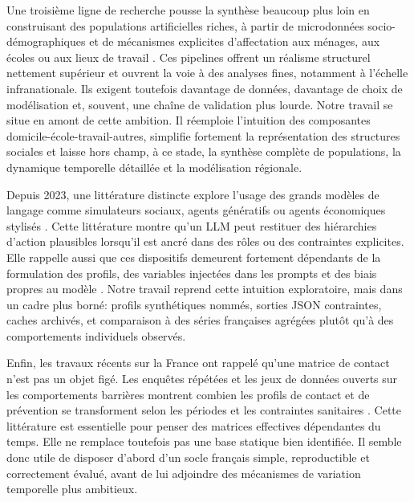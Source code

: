 \documentclass[ROIA,Unicode]{cedram}
\begin{document}
Une troisième ligne de recherche pousse la synthèse beaucoup plus loin en construisant des populations artificielles riches, à partir de microdonnées socio-démographiques et de mécanismes explicites d'affectation aux ménages, aux écoles ou aux lieux de travail \citep{mistry2021inferring}. Ces pipelines offrent un réalisme structurel nettement supérieur et ouvrent la voie à des analyses fines, notamment à l'échelle infranationale. Ils exigent toutefois davantage de données, davantage de choix de modélisation et, souvent, une chaîne de validation plus lourde. Notre travail se situe en amont de cette ambition. Il réemploie l'intuition des composantes domicile-école-travail-autres, simplifie fortement la représentation des structures sociales et laisse hors champ, à ce stade, la synthèse complète de populations, la dynamique temporelle détaillée et la modélisation régionale.

Depuis 2023, une littérature distincte explore l'usage des grands modèles de langage comme simulateurs sociaux, agents génératifs ou agents économiques stylisés \citep{park2023generative,argyle2023out,horton2023homo}. Cette littérature montre qu'un LLM peut restituer des hiérarchies d'action plausibles lorsqu'il est ancré dans des rôles ou des contraintes explicites. Elle rappelle aussi que ces dispositifs demeurent fortement dépendants de la formulation des profils, des variables injectées dans les prompts et des biais propres au modèle \citep{weidinger2022taxonomy,bender2021stochastic}. Notre travail reprend cette intuition exploratoire, mais dans un cadre plus borné: profils synthétiques nommés, sorties JSON contraintes, caches archivés, et comparaison à des séries françaises agrégées plutôt qu'à des comportements individuels observés.

Enfin, les travaux récents sur la France ont rappelé qu'une matrice de contact n'est pas un objet figé. Les enquêtes répétées et les jeux de données ouverts sur les comportements barrières montrent combien les profils de contact et de prévention se transforment selon les périodes et les contraintes sanitaires \citep{soussand2025socialcov,socialcov2024,coviprev2021}. Cette littérature est essentielle pour penser des matrices effectives dépendantes du temps. Elle ne remplace toutefois pas une base statique bien identifiée. Il semble donc utile de disposer d'abord d'un socle français simple, reproductible et correctement évalué, avant de lui adjoindre des mécanismes de variation temporelle plus ambitieux.
\end{document}
